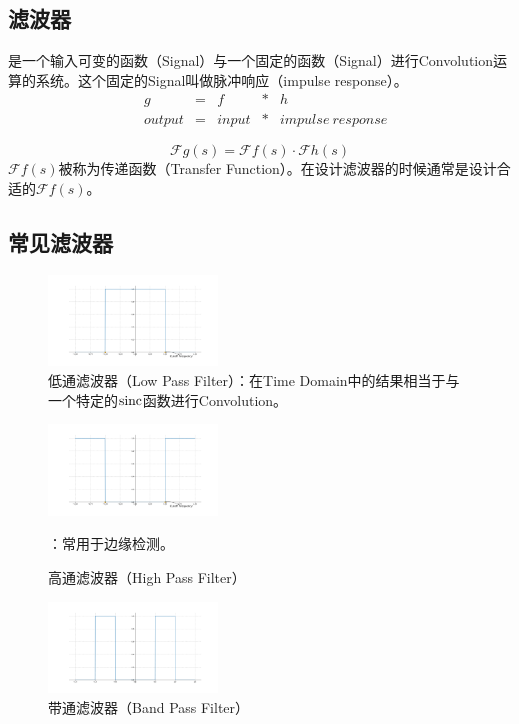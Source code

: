 \subsection{滤波器}
是一个输入可变的函数（Signal）与一个固定的函数（Signal）进行Convolution运算的系统。这个固定的Signal叫做脉冲响应（impulse response）。
\begin{align*}
	 & g      & = & f     & * & h                 \\
	 & output & = & input & * & impulse\ response
\end{align*}

$$
	\mathcal{F}g(s)=\mathcal{F}f(s)\cdot \mathcal{F}h(s)
$$
$\mathcal{F}f(s)$被称为传递函数（Transfer Function）。在设计滤波器的时候通常是设计合适的$\mathcal{F}f(s)$。
\subsection{常见滤波器}
\begin{figure}[H]
	\centering
	\includegraphics[width=0.4\textwidth]{assets/Figure_5.png}
	\caption{低通滤波器（Low Pass Filter）：在Time Domain中的结果相当于与一个特定的$\operatorname{sinc}$函数进行Convolution。}
\end{figure}
\begin{figure}[H]
	\centering
	\includegraphics[width=0.4\textwidth]{assets/Figure_6.png}
	\caption{高通滤波器（High Pass Filter）}：常用于边缘检测。
\end{figure}
\begin{figure}[H]
	\centering
	\includegraphics[width=0.4\textwidth]{assets/Figure_7.png}
	\caption{带通滤波器（Band Pass Filter）}
\end{figure}
